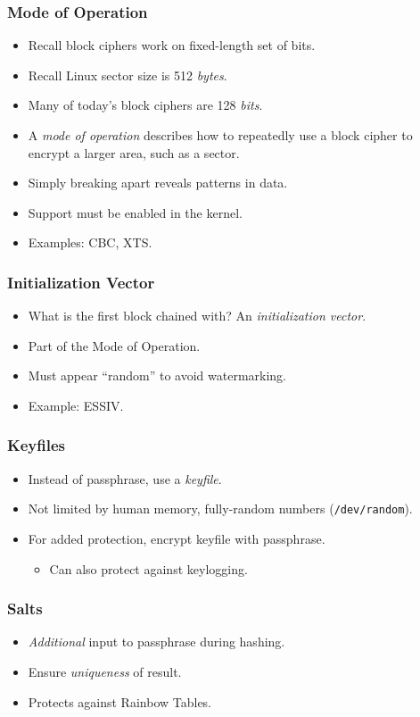 \documentclass[xcolor={dvipsnames,svgnames},hyperref=dvips]{beamer}
\begin{document}
	\begin{frame}
		\frametitle{Mode of Operation}
		\begin{itemize}
		\item Recall block ciphers work on fixed-length set of bits.
		\item Recall Linux sector size is 512 \textit{bytes}.
		\item Many of today's block ciphers are 128 \textit{bits}.
		\item A \textit{mode of operation} describes how to repeatedly use a block cipher to encrypt a larger area, such as a sector.
		\item Simply breaking apart reveals patterns in data.
		\item Support must be enabled in the kernel.
		\item Examples: CBC, XTS.
		\end{itemize}
	\end{frame}

	\begin{frame}
		\frametitle{Initialization Vector}
		\begin{itemize}
		\item What is the first block chained with? An \textit{initialization vector}.
		\item Part of the Mode of Operation.
		\item Must appear ``random'' to avoid watermarking.
		\item Example: ESSIV.
		\end{itemize}
	\end{frame}

	\begin{frame}
		\frametitle{Keyfiles}
		\begin{itemize}
		\item Instead of passphrase, use a \textit{keyfile}.
		\item Not limited by human memory, fully-random numbers (\texttt{/dev/random}).
		\item For added protection, encrypt keyfile with passphrase.
			\begin{itemize}
			\item Can also protect against keylogging.
			\end{itemize}
		\end{itemize}
	\end{frame}

	\begin{frame}
		\frametitle{Salts}
		\begin{itemize}
		\item \textit{Additional} input to passphrase during hashing.
		\item Ensure \textit{uniqueness} of result.
		\item Protects against Rainbow Tables.
		\end{itemize}
	\end{frame}
\end{document}
